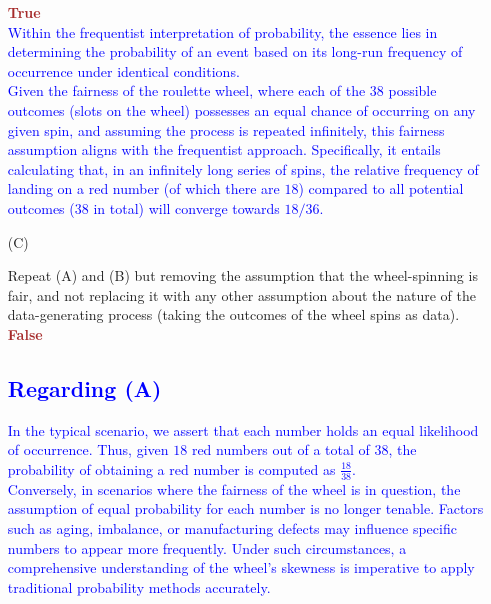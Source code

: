 \documentclass[12pt]{article}
\begin{document}
\begin{itemize}
\textbf{\textcolor{brown}{True}} \\
\textcolor{blue}{Within the frequentist interpretation of probability, the essence lies in determining the probability of an event based on its long-run frequency of occurrence under identical conditions.\\
Given the fairness of the roulette wheel, where each of the \textcolor{blue}{\(38\)} possible outcomes (slots on the wheel) possesses an equal chance of occurring on any given spin, and assuming the process is repeated infinitely, this fairness assumption aligns with the frequentist approach. Specifically, it entails calculating that, in an infinitely long series of spins, the relative frequency of landing on a red number (of which there are \textcolor{blue}{\(18\)}) compared to all potential outcomes (\textcolor{blue}{\(38\)} in total) will converge towards \textcolor{blue}{\(18/36\)}.}

    
\item[(C)]

Repeat (A) and (B) but removing the assumption that the wheel-spinning is fair, and not replacing it with any other assumption about the nature of the data-generating process (taking the outcomes of the wheel spins as data). \\ 
    \textcolor{brown}{\textbf{False}}
\subsection*{\textcolor{blue}{\textbf{Regarding (A)}}}
\textcolor{blue}{
In the typical scenario, we assert that each number holds an equal likelihood of occurrence. Thus, given \textcolor{blue}{\(18\)} red numbers out of a total of \textcolor{blue}{\(38\)}, the probability of obtaining a red number is computed as \(\frac{18}{38}\).\\
Conversely, in scenarios where the fairness of the wheel is in question, the assumption of equal probability for each number is no longer tenable. Factors such as aging, imbalance, or manufacturing defects may influence specific numbers to appear more frequently. Under such circumstances, a comprehensive understanding of the wheel's skewness is imperative to apply traditional probability methods accurately.
} \\

\end{itemize}
\end{document}
